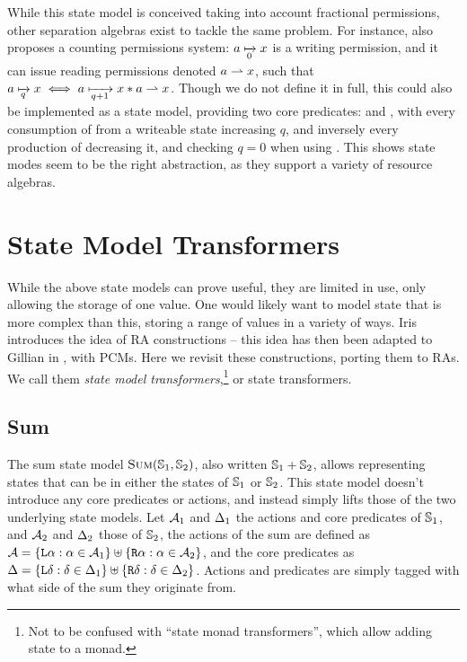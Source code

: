 While this state model is conceived taking into account fractional permissions, other separation algebras exist to tackle the same problem. For instance, \cite{fracpermissions} also proposes a counting permissions system: $a\mapstoq{0}x$ is a writing permission, and it can issue reading permissions denoted $a\rightharpoonup x$, such that $a\mapstoq{q}x \iff a\mapstoq{q+1}x * a\part x$. Though we do not define it in full, this could also be implemented as a state model, providing two core predicates:  and , with every consumption of  from a writeable state increasing $q$, and inversely every production of  decreasing it, and checking $q=0$ when using \store. This shows state modes seem to be the right abstraction, as they support a variety of resource algebras.

\section{State Model Transformers} \label{sec:theory-state-model-transf}

While the above state models can prove useful, they are limited in use, only allowing the storage of one value. One would likely want to model state that is more complex than this, storing a range of values in a variety of ways. Iris introduces the idea of RA constructions \cite{iris} -- this idea has then been adapted to Gillian in \cite{sacha-phd}, with PCMs. Here we revisit these constructions, porting them to RAs. We call them \emph{state model transformers},\footnote{Not to be confused with ``state monad transformers'', which allow adding state to a monad.} or state transformers.

\subsection{Sum}

The sum state model $\textsc{Sum}(\mathbb S_1,\mathbb S_2)$, also written $\mathbb S_1 + \mathbb S_2$, allows representing states that can be in either the states of $\mathbb S_1$ or $\mathbb S_2$. This state model doesn't introduce any core predicates or actions, and instead simply lifts those of the two underlying state models. Let ${\cal{A}}_1$ and $\Delta_1$ the actions and core predicates of $\mathbb S_1$, and ${\cal{A}}_2$ and $\Delta_2$ those of $\mathbb S_2$, the actions of the sum are defined as ${{\cal{A}} = \{\texttt{L}\alpha : \alpha \in {\ensuremath{\cal{A}}}_1 \} \uplus \{\texttt{R}\alpha : \alpha \in {\ensuremath{\cal{A}}}_2 \}}$, and the core predicates as ${\Delta = \{\texttt{L}\delta : \delta \in \Delta_1 \} \uplus \{\texttt{R}\delta : \delta \in \Delta_2 \}}$. Actions and predicates are simply tagged with what side of the sum they originate from.

